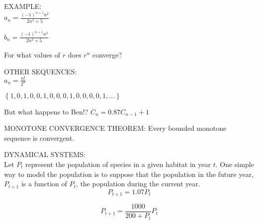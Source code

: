 \documentclass[11pt]{article}
\begin{document}
\vspace{.1in}

EXAMPLE:\\

$a_n=\frac{(-1)^{n+1}n^2}{2n^4+5}$

\vspace{1in}

$b_n=\frac{(-1)^{n+1}n^2}{2n^2+5}$


\vspace{1.2in}

For what values of $r$ does $r^n$ converge?

\vspace{1.5in}

OTHER SEQUENCES:\\

$a_n=\frac{n!}{2^n}$

\vspace{1.2in}




$\left\{1, 0, 1, 0, 0, 1, 0, 0, 0, 1, 0, 0, 0, 0, 1,   ... \right\}$

\pagebreak

But what happens to Ben!?  $C_n = 0.87C_{n-1} + 1$

\vspace{5in}

MONOTONE CONVERGENCE THEOREM:  Every bounded monotone sequence is convergent.

\pagebreak



DYNAMICAL SYSTEMS: \\

Let $P_t$ represent the population of species in a given habitat in year $t$.  One simple way to model the population is to suppose that the population in the future year, $P_{t+1}$ is a function of $P_{t}$, the population during the current year.\\

\begin{displaymath}
P_{t+1} = 1.07P_t
  \end{displaymath}

\vspace{2.5in}

\begin{displaymath}
P_{t+1} = \frac{1000}{200+P_t}P_t
  \end{displaymath}
\end{document}
